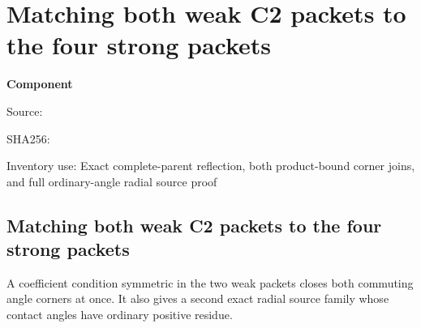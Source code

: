 \chapter{Matching both weak C2 packets to the four strong packets}
\label{component:p8b53b68d8af6}
\noindent\textbf{Component }\par
{\small\noindent Source: \par}
{\small\noindent SHA256: \par}
{\small\noindent Inventory use: Exact complete-parent reflection, both product-bound corner joins, and full ordinary-angle radial source proof\par}
\medskip
\section{Matching both weak C2 packets to the four strong packets}
\label{p8b53b68d8af6:sec:c2-matching-strength}

A coefficient condition symmetric in the two weak packets closes both
commuting angle corners at once.  It also gives a second exact radial
source family whose contact angles have ordinary positive residue.

